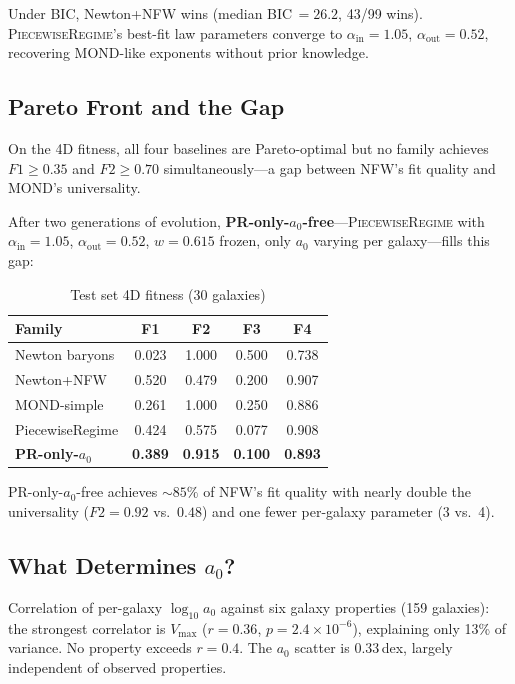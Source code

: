 \documentclass[aps,prl,twocolumn,superscriptaddress,showpacs]{revtex4-2}
\newcommand{\pr}{\textsc{PiecewiseRegime}}
\begin{document}
Under BIC, Newton+NFW wins (median BIC\,$=26.2$, 43/99 wins). \pr{}'s best-fit law parameters converge to $\alpha_\mathrm{in}=1.05$, $\alpha_\mathrm{out}=0.52$, recovering MOND-like exponents without prior knowledge.

\subsection{Pareto Front and the Gap}\label{sec:pareto}

On the 4D fitness, all four baselines are Pareto-optimal but no family achieves $F1 \geq 0.35$ and $F2 \geq 0.70$ simultaneously---a gap between NFW's fit quality and MOND's universality.

After two generations of evolution, \textbf{PR-only-$a_0$-free}---\pr{} with $\alpha_\mathrm{in}=1.05$, $\alpha_\mathrm{out}=0.52$, $w=0.615$ frozen, only $a_0$ varying per galaxy---fills this gap:

\begin{table}[h]
\caption{Test set 4D fitness (30 galaxies)\label{tab:test}}
\begin{ruledtabular}
\begin{tabular}{lcccc}
Family & F1 & F2 & F3 & F4 \\
\hline
Newton baryons     & 0.023 & 1.000 & 0.500 & 0.738 \\
Newton+NFW         & 0.520 & 0.479 & 0.200 & 0.907 \\
MOND-simple        & 0.261 & 1.000 & 0.250 & 0.886 \\
PiecewiseRegime    & 0.424 & 0.575 & 0.077 & 0.908 \\
\textbf{PR-only-$a_0$} & \textbf{0.389} & \textbf{0.915} & \textbf{0.100} & \textbf{0.893} \\
\end{tabular}
\end{ruledtabular}
\end{table}

PR-only-$a_0$-free achieves ${\sim}85\%$ of NFW's fit quality with nearly double the universality ($F2=0.92$ vs.\ $0.48$) and one fewer per-galaxy parameter (3 vs.\ 4).

\subsection{What Determines $a_0$?}\label{sec:a0}

Correlation of per-galaxy $\log_{10} a_0$ against six galaxy properties (159 galaxies): the strongest correlator is $V_\mathrm{max}$ ($r=0.36$, $p=2.4\times10^{-6}$), explaining only 13\% of variance. No property exceeds $r=0.4$. The $a_0$ scatter is $0.33$\,dex, largely independent of observed properties.
\end{document}
